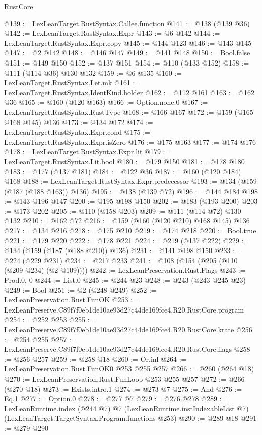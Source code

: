 \begin{lexlean}{RustCore}
\begin{coremodule}
@139 := LexLeanTarget.RustSyntax.Callee.function
@141 := @138 (@139 @36)
@142 := LexLeanTarget.RustSyntax.Expr
@143 := @6 @142
@144 := LexLeanTarget.RustSyntax.Expr.copy
@145 := @144 @123
@146 := @143 @145
@147 := @2 @142
@148 := @146 @147
@149 := @141 @148
@150 := Bool.false
@151 := @149 @150
@152 := @137 @151
@154 := @110 (@133 @152)
@158 := @111 (@114 @36) @130 @132
@159 := @6 @135
@160 := LexLeanTarget.RustSyntax.Let.mk
@161 := LexLeanTarget.RustSyntax.IdentKind.holder
@162 := @112 @161
@163 := @162 @36
@165 := @160 (@120 @163)
@166 := Option.none.{0}
@167 := LexLeanTarget.RustSyntax.RustType
@168 := @166 @167
@172 := @159 (@165 @168 @145) @136
@173 := @134 @172
@174 := LexLeanTarget.RustSyntax.Expr.cond
@175 := LexLeanTarget.RustSyntax.Expr.isZero
@176 := @175 @163
@177 := @174 @176
@178 := LexLeanTarget.RustSyntax.Expr.lit
@179 := LexLeanTarget.RustSyntax.Lit.bool
@180 := @179 @150
@181 := @178 @180
@183 := @177 (@137 @181)
@184 := @122 @36
@187 := @160 (@120 @184) @168
@188 := LexLeanTarget.RustSyntax.Expr.predecessor
@193 := @134 (@159 (@187 (@188 @163)) @136)
@195 := @138 (@139 @72)
@196 := @144 @184
@198 := @143 @196 @147
@200 := @195 @198 @150
@202 := @183 (@193 @200)
@203 := @173 @202
@205 := @110 (@158 @203)
@209 := @111 (@114 @72) @130 @132
@210 := @162 @72
@216 := @159 (@160 (@120 @210) @168 @145) @136
@217 := @134 @216
@218 := @175 @210
@219 := @174 @218
@220 := Bool.true
@221 := @179 @220
@222 := @178 @221
@224 := @219 (@137 @222)
@229 := @134 (@159 (@187 (@188 @210)) @136)
@231 := @141 @198 @150
@233 := @224 (@229 @231)
@234 := @217 @233
@241 := @108 (@154 (@205 (@110 (@209 @234) (@2 @109))))
@242 := LexLeanPreservation.Rust.Flags
@243 := Prod.{0, 0}
@244 := List.{0}
@245 := @244 @23
@248 := @243 (@243 @245 @23)
@249 := Bool
@251 := @2 (@248 @249)
@252 := LexLeanPreservation.Rust.FunOK
@253 := LexLeanPreserve.C89f7f0eb1de10ae93d27c44de169fce4.R20.RustCore.program
@254 := @252 @253
@255 := LexLeanPreserve.C89f7f0eb1de10ae93d27c44de169fce4.R20.RustCore.krate
@256 := @254 @255
@257 := LexLeanPreserve.C89f7f0eb1de10ae93d27c44de169fce4.R20.RustCore.flags
@258 := @256 @257
@259 := @258 @18
@260 := Or.inl
@264 := LexLeanPreservation.Rust.FunOK0 @253 @255 @257
@266 := @260 (@264 @18)
@270 := LexLeanPreservation.Rust.FunLoop @253 @255 @257
@272 := @266 (@270 @18)
@273 := Exists.intro.{1}
@274 := @273 @7
@275 := And
@276 := Eq.{1}
@277 := Option.{0}
@278 := @277 @7
@279 := @276 @278
@289 := LexLeanRuntime.index
    (@244 @7)
    @7
    (LexLeanRuntime.instIndexableList @7)
    (LexLeanTarget.TargetSyntax.Program.functions @253)
@290 := @289 @18
@291 := @279 @290

\end{coremodule}
\end{lexlean}
